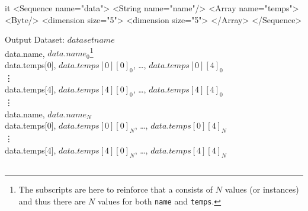 \documentclass[justify]{dods-paper}
\begin{document}
\begin{enumerate}
\begin{minipage}[t]{2.25in}
\begin{vcode}{it}
<Sequence name="data">
  <String name="name"/>
  <Array name="temps">
    <Byte/>
    <dimension size="5">
    <dimension size="5">
  </Array>
</Sequence>    
\end{vcode}
\end{minipage}
\begin{minipage}[t]{4in}
\begin{textoutput}{Output}
Dataset: $dataset name$\\
data.name, $data.name_0$\footnote{The subscripts are here to reinforce that a
 \Sequence consists of $N$ values (or instances) and thus there are $N$
  values for both \texttt{name} and \texttt{temps}.}\\
data.temps[0], $data.temps[0][0]_0$, \ldots, $data.temps[0][4]_0$\\
\vdots\\
data.temps[4], $data.temps[4][0]_0$, \ldots, $data.temps[4][4]_0$\\
\vdots\\
data.name, $data.name_N$\\
data.temps[0], $data.temps[0][0]_N$, \ldots, $data.temps[0][4]_N$\\
\vdots\\
data.temps[4], $data.temps[4][0]_N$, \ldots, $data.temps[4][4]_N$\\
\end{textoutput}
\end{minipage}

\end{enumerate}

\subsection{\Arrays}
\label{sec-ascii-array}
\end{document}
